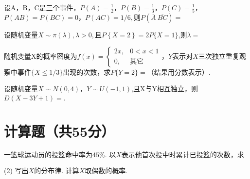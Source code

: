 \begin{problem}
    设A，B，C是三个事件，$P(A)=\frac12$，$P(B)=\frac13$，$P(C)=\frac15$，$P(AB)=P(BC)=0$，$P(AC)=1/6,则P(\overline A\ \overline{BC})=$\ans{}
\end{problem}
\begin{solution}

\end{solution}

\begin{problem}
    设随机变量$X\sim\pi(\lambda),\lambda>0,且P\left\{X=2\right\}=2P\{X=1\}$,则$\lambda=$\ans{}
\end{problem}
\begin{solution}

\end{solution}

\begin{problem}
    随机变量X的概率密度为$f(x)=
    \begin{cases}
        2x, &0<x<1\\
        0,  &\text{其它}
    \end{cases}$，$Y$表示对$X$三次独立重复观察中事件$\{X\leq1/3\}$出现的次数，求$P\{Y=2\}=$\ans{}（结果用分数表示）.
\end{problem}
\begin{solution}

\end{solution}

\begin{problem}
    设随机变量$X\sim N(0,4)$，$Y\sim U(-1,1)$,且X与Y相互独立，则$D(X-3Y+1)=$\ans{}.
\end{problem}
\begin{solution}

\end{solution}

\section{计算题（共55分）}

\begin{problem}[本题8分]
    一篮球运动员的投篮命中率为$45\%$. 以$X$表示他首次投中时累计已投篮的次数，求
    \begin{tasks}[label=\arabic*.](2)
        \task 写出$X$的分布律.
        \task 计算$X$取偶数的概率.
    \end{tasks}
\end{problem}
\begin{solution}

\end{solution}


